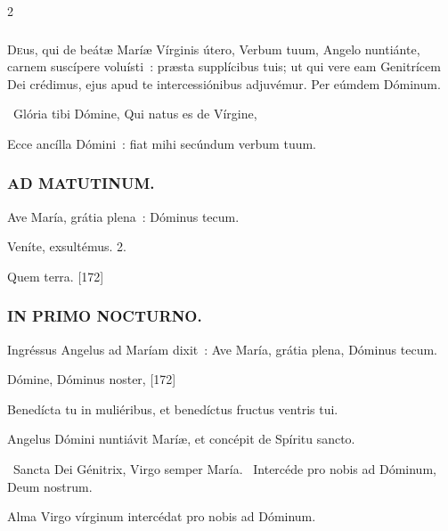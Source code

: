 \documentclass[9pt,twoside]{extarticle}
\begin{document}
\begin{multicols}{2}
{{\subsubsection*{\center {}}
\lettrine{D}eus, qui de beátæ Maríæ Vírginis útero, Verbum tuum, Angelo nuntiánte, carnem suscípere voluísti~: præsta supplícibus tuis; ut qui vere eam Genitrícem Dei crédimus, ejus apud te intercessiónibus adjuvémur. Per eúmdem Dóminum.

\begin{tightlist}{}
\item {}~Glória tibi Dómine, Qui natus es de Vírgine, 
\item {} Ecce ancílla Dómini~: fiat mihi secúndum verbum tuum.
\end{tightlist}

\subsubsection*{\center \textsc{AD MATUTINUM.}}
\begin{tightlist}{}
\item {} Ave María, grátia plena~: \textred{*} Dóminus tecum.
\item {} Veníte, exsultémus. 2.
\item {} Quem terra. [172]
\end{tightlist}

\subsubsection*{\center \textsc{IN PRIMO NOCTURNO.}}
\begin{tightlist}{}
\item {} Ingréssus Angelus ad Maríam dixit~: Ave María, grátia plena, Dóminus tecum.
\item {} Dómine, Dóminus noster,  [172]
\item {} Benedícta tu in muliéribus, et benedíctus fructus ventris tui.
\item {} Angelus Dómini nuntiávit Maríæ, et concépit de Spíritu sancto.
\item {}~Sancta Dei Génitrix, Virgo semper María. ~Intercéde pro nobis ad Dóminum, Deum nostrum.
\item {}
\item {\small {} Alma Virgo vírginum intercédat pro nobis ad Dóminum.}
\end{tightlist}

}}
\end{multicols}
\end{document}
